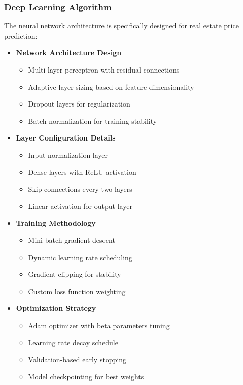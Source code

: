 \documentclass[12pt,a4paper]{report}
\begin{document}
\subsubsection{Deep Learning Algorithm}
The neural network architecture is specifically designed for real estate price prediction:

\begin{itemize}
    \item \textbf{Network Architecture Design}
    \begin{itemize}
        \item Multi-layer perceptron with residual connections
        \item Adaptive layer sizing based on feature dimensionality
        \item Dropout layers for regularization
        \item Batch normalization for training stability
    \end{itemize}
    
    \item \textbf{Layer Configuration Details}
    \begin{itemize}
        \item Input normalization layer
        \item Dense layers with ReLU activation
        \item Skip connections every two layers
        \item Linear activation for output layer
    \end{itemize}
    
    \item \textbf{Training Methodology}
    \begin{itemize}
        \item Mini-batch gradient descent
        \item Dynamic learning rate scheduling
        \item Gradient clipping for stability
        \item Custom loss function weighting
    \end{itemize}
    
    \item \textbf{Optimization Strategy}
    \begin{itemize}
        \item Adam optimizer with beta parameters tuning
        \item Learning rate decay schedule
        \item Validation-based early stopping
        \item Model checkpointing for best weights
    \end{itemize}
\end{itemize}
\end{document}

